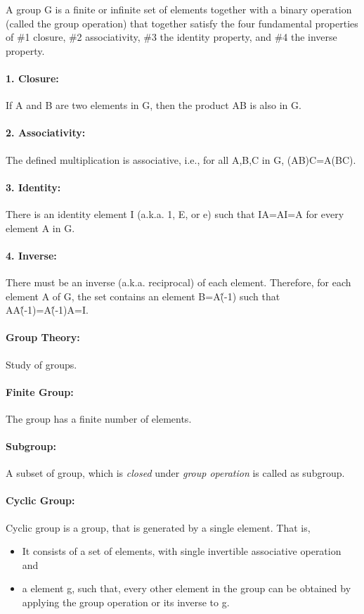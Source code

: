 \documentclass[12pt]{article}
\begin{document}
A group G is a finite or infinite set of elements together with a binary operation (called the group operation) that together satisfy the four fundamental properties of \#1 closure, \#2 associativity, \#3 the identity property, and \#4 the inverse property. 

\paragraph{1. Closure:} If A and B are two elements in G, then the product AB is also in G.

\paragraph{2. Associativity:} The defined multiplication is associative, i.e., for all A,B,C in G, (AB)C=A(BC).

\paragraph{3. Identity:} There is an identity element I (a.k.a. 1, E, or e) such that IA=AI=A for every element A in G.

\paragraph{4. Inverse:} There must be an inverse (a.k.a. reciprocal) of each element. Therefore, for each element A of G, the set contains an element B=A\^(-1) such that AA\^(-1)=A\^(-1)A=I.

\paragraph{Group Theory:} Study of groups.

\paragraph{Finite Group:} The group has a finite number of elements.

\paragraph{Subgroup:} A subset of group, which is \textit{closed} under \textit{group operation} is called as subgroup.

\paragraph{Cyclic Group:} Cyclic group is a group, that is generated by a single element. That is,
\begin{itemize}
\item It consists of a set of elements, with single invertible associative operation and
\item a element g, such that, every other element in the group can be obtained by applying the group operation or its inverse to g.
\end{itemize}
\end{document}
